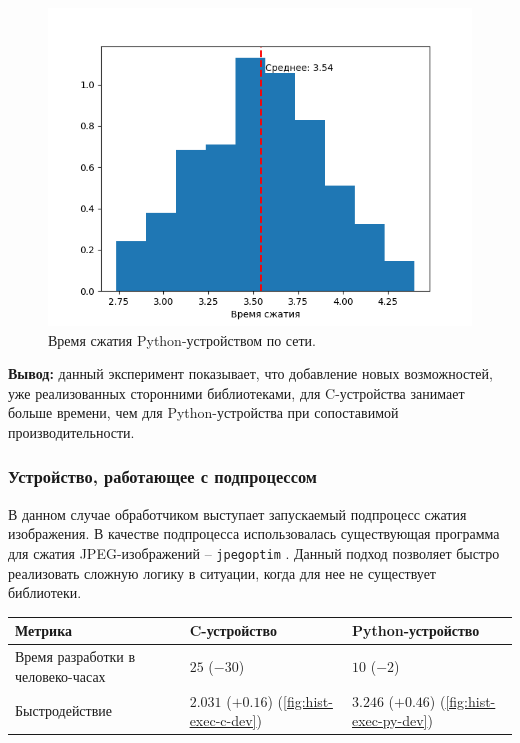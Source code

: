 \begin{figure}[!htbp]
    \centering
    \begin{adjustbox}{max totalsize={0.8\textwidth}{\textheight}}
        \includegraphics{images/hist-lib-py-network.png}
    \end{adjustbox}
    \caption{Время сжатия Python-устройством по сети.}\label{fig:hist-lib-py-network}
\end{figure}

\textbf{Вывод:} данный эксперимент показывает, что добавление новых возможностей,
уже реализованных сторонними библиотеками, для C-устройства занимает больше времени,
чем для Python-устройства при сопоставимой производительности.

\subsubsection{Устройство, работающее с подпроцессом}\label{sec:ch3/sec2/sec2/sec2}

В данном случае обработчиком выступает запускаемый подпроцесс сжатия
изображения. В качестве подпроцесса использовалась существующая программа
для сжатия JPEG-изображений -- \texttt{jpegoptim} \cite{jpegoptim}.
Данный подход позволяет быстро реализовать сложную логику в ситуации, когда
для нее не существует библиотеки.

\begin{longtable}{| p{5cm} | p{5cm} | p{5cm} |}
    \hline
    Метрика & C-устройство & Python-устройство \\
    \hline
        Время разработки в человеко-часах &
        $25$ ($-30$) &
        $10$ ($-2$) \\
    \hline
        Быстродействие &
        $2.031$ ($+0.16$) (\cref{fig:hist-exec-c-dev}) &
        $3.246$ ($+0.46$) (\cref{fig:hist-exec-py-dev}) \\
    \hline
\end{longtable}

